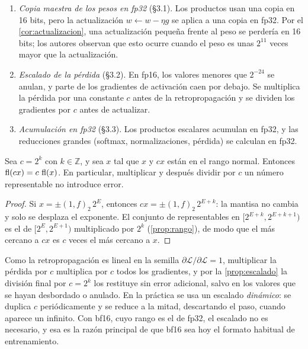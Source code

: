 \begin{enumerate}[label=(\arabic*)]
  \item \emph{Copia maestra de los pesos en fp32} (§3.1). Los productos usan una copia en 16 bits, pero la actualización $w\gets w-\eta g$ se aplica a una copia en fp32. Por el \cref{cor:actualizacion}, una actualización pequeña frente al peso se perdería en 16 bits; los autores observan que esto ocurre cuando el peso es unas $2^{11}$ veces mayor que la actualización.
  \item \emph{Escalado de la pérdida} (§3.2). En fp16, los valores menores que $2^{-24}$ se anulan, y parte de los gradientes de activación caen por debajo. Se multiplica la pérdida por una constante $c$ antes de la retropropagación y se dividen los gradientes por $c$ antes de actualizar.
  \item \emph{Acumulación en fp32} (§3.3). Los productos escalares acumulan en fp32, y las reducciones grandes (softmax, normalizaciones, pérdida) se calculan en fp32.
\end{enumerate}

\begin{proposicion}\label{prop:escalado}
Sea $c=2^{k}$ con $k\in\mathbb{Z}$, y sea $x$ tal que $x$ y $cx$ están en el rango normal. Entonces $\operatorname{fl}(cx)=c\,\operatorname{fl}(x)$. En particular, multiplicar y después dividir por $c$ un número representable no introduce error.
\end{proposicion}

\begin{proof}
Si $x=\pm(1{,}f)_2\,2^{E}$, entonces $cx=\pm(1{,}f)_2\,2^{E+k}$: la mantisa no cambia y solo se desplaza el exponente. El conjunto de representables en $[2^{E+k},2^{E+k+1})$ es el de $[2^{E},2^{E+1})$ multiplicado por $2^{k}$ (\cref{prop:rango}), de modo que el más cercano a $cx$ es $c$ veces el más cercano a $x$.
\end{proof}

Como la retropropagación es lineal en la semilla $\partial\mathcal{L}/\partial\mathcal{L}=1$, multiplicar la pérdida por $c$ multiplica por $c$ todos los gradientes, y por la \cref{prop:escalado} la división final por $c=2^{k}$ los restituye sin error adicional, salvo en los valores que se hayan desbordado o anulado. En la práctica se usa un escalado \emph{dinámico}: se duplica $c$ periódicamente y se reduce a la mitad, descartando el paso, cuando aparece un infinito. Con bf16, cuyo rango es el de fp32, el escalado no es necesario, y esa es la razón principal de que bf16 sea hoy el formato habitual de entrenamiento.

